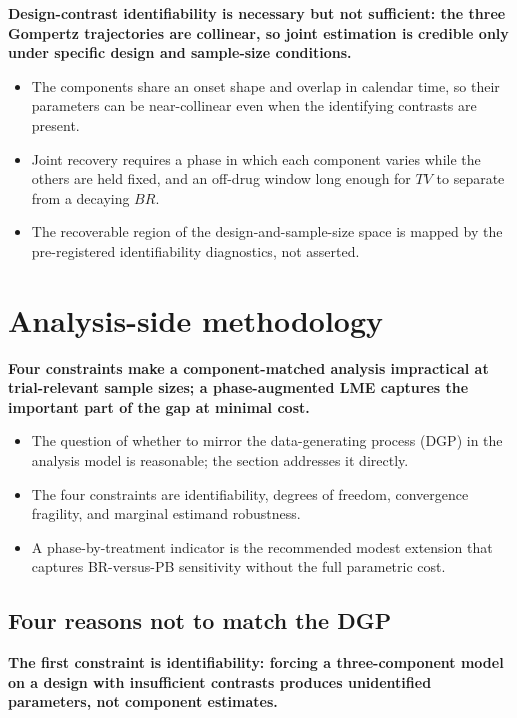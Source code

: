 \documentclass[
  11pt,
]{article}
\begin{document}
\textbf{Design-contrast identifiability is necessary but not sufficient: the three Gompertz trajectories are collinear, so joint estimation is credible only under specific design and sample-size conditions.}

\begin{itemize}\setlength{\itemsep}{2pt}\setlength{\parskip}{0pt}
\item The components share an onset shape and overlap in calendar time, so their parameters can be near-collinear even when the identifying contrasts are present.
\item Joint recovery requires a phase in which each component varies while the others are held fixed, and an off-drug window long enough for $TV$ to separate from a decaying $BR$.
\item The recoverable region of the design-and-sample-size space is mapped by the pre-registered identifiability diagnostics, not asserted.
\end{itemize}

\section{Analysis-side methodology}\label{analysis-side-methodology}

\textbf{Four constraints make a component-matched analysis impractical at trial-relevant sample sizes; a phase-augmented LME captures the important part of the gap at minimal cost.}

\begin{itemize}\setlength{\itemsep}{2pt}\setlength{\parskip}{0pt}
\item The question of whether to mirror the data-generating process (DGP) in the analysis model is reasonable; the section addresses it directly.
\item The four constraints are identifiability, degrees of freedom, convergence fragility, and marginal estimand robustness.
\item A phase-by-treatment indicator is the recommended modest extension that captures BR-versus-PB sensitivity without the full parametric cost.
\end{itemize}

\subsection{Four reasons not to match the DGP}\label{four-reasons-not-to-match-the-dgp}

\textbf{The first constraint is identifiability: forcing a three-component model on a design with insufficient contrasts produces unidentified parameters, not component estimates.}
\end{document}
